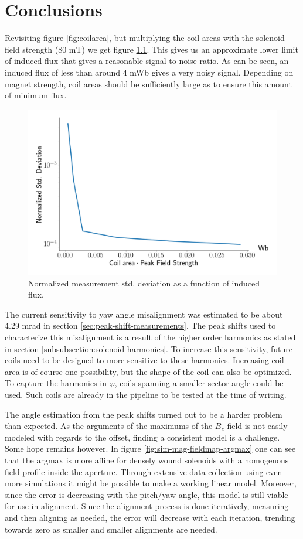 \chapter{Conclusions}
Revisiting figure \ref{fig:coilarea}, but multiplying
the coil areas with the solenoid field strength ($80$ mT)
we get figure \ref{fig:coilarea-weber}. This gives us an approximate
lower limit of induced flux that gives a reasonable signal 
to noise ratio. As can be seen, an induced flux of less than around
4 mWb gives a very noisy signal. Depending on magnet strength,
coil areas should be sufficiently large as to 
ensure this amount of minimum flux.

\begin{figure}[!h]
    \centering
    \includegraphics[width=0.8\linewidth]{figs/areatofield}
    \caption{Normalized measurement std. deviation as a function of
        induced flux.}
    \label{fig:coilarea-weber}
\end{figure}

The current sensitivity to yaw angle misalignment was estimated
to be about 4.29 mrad in section \ref{sec:peak-shift-measurements}.
The peak shifts used to characterize this misalignment is a
result of the higher order harmonics as stated in section
\ref{subsubsection:solenoid-harmonics}. To increase this
sensitivity, future coils need to be designed to more
sensitive to these harmonics. Increasing coil area is
of course one possibility, but the shape of the coil can
also be optimized. To capture the harmonics in $\varphi$,
coils spanning a smaller sector angle could be used. Such
coils are already in the pipeline to be tested at the time
of writing.

The angle estimation from the peak shifts turned out to be 
a harder problem than expected. As the arguments of the maximums of the
$B_z$ field is not easily modeled with regards to the offset, finding
a consistent model is a challenge. Some hope remains however. In figure
\ref{fig:sim-mag-fieldmap-argmax} one can see that the argmax is more affine
for densely wound solenoids with a homogenous field profile inside the aperture.
Through extensive data collection using even more simulations it might be
possible to make a working linear model. Moreover, since the error is 
decreasing with the pitch/yaw angle, this model is still viable 
for use in alignment. Since the alignment process is done iteratively,
measuring and then aligning as needed, the error will decrease with 
each iteration, trending towards zero as smaller and smaller alignments
are needed.

